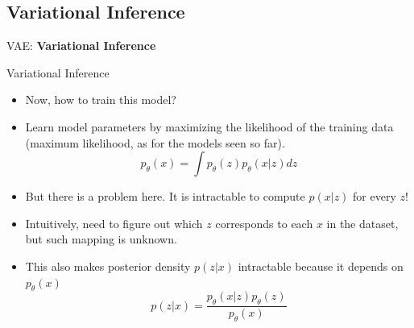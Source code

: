 \subsection{Variational Inference}
\begin{frame}{}
    \LARGE VAE: \textbf{Variational Inference}
\end{frame}

\begin{frame}{Variational Inference}
\begin{itemize}
    \item Now, how to train this model?
    \item<2-> Learn model parameters by maximizing the likelihood of the training data (maximum likelihood, as for the models seen so far).
    $$p_{\theta}(x) = \int p_{\theta}(z) p_{\theta}(x|z) dz$$
    \item<3-> But there is a problem here. It is intractable to compute $p(x|z)$ for every $z$!
    \item<4-> Intuitively, need to figure out which $z$ corresponds to each $x$ in the dataset, but such mapping is unknown.
    \item<5-> This also makes posterior density $p(z|x)$ intractable because it depends on $p_{\theta}(x)$
    $$p(z|x) = \frac{p_{\theta}(x|z) p_{\theta}(z)}{p_{\theta}(x)}$$
\end{itemize}
\end{frame}

